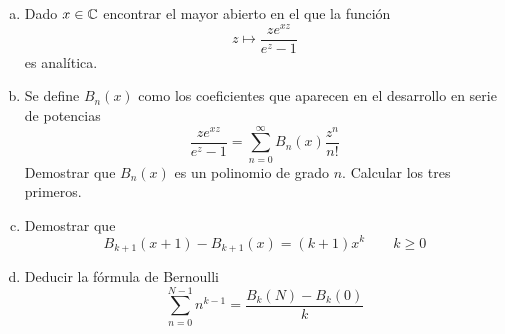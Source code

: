 \documentclass[twoside]{article}
\begin{document}
\newpage 
\begin{ejercicio}{7}
\begin{enumerate}[(a)]
\item Dado $x\in \mathbb{C}$ encontrar el mayor abierto en el que la función
$$
z\mapsto \frac{ze^{xz}}{e^z-1}
$$
es analítica.
\item Se define $B_n(x)$ como los coeficientes que aparecen en el desarrollo en serie de potencias
$$
\frac{ze^{xz}}{e^z-1}= \sum_{n=0}^\infty B_n(x)\frac{z^n}{n!}
$$
Demostrar que $B_n(x)$ es un polinomio de grado $n$. Calcular los tres primeros.
\item Demostrar que 
$$
B_{k+1}(x+1)-B_{k+1}(x)=(k+1)x^k\qquad k\geq 0
$$
\item Deducir la fórmula de Bernoulli
$$
\sum_{n=0}^{N-1} n^{k-1} = \frac{B_k(N)-B_k(0)}{k}
$$
\end{enumerate}
\end{ejercicio}
\end{document}
